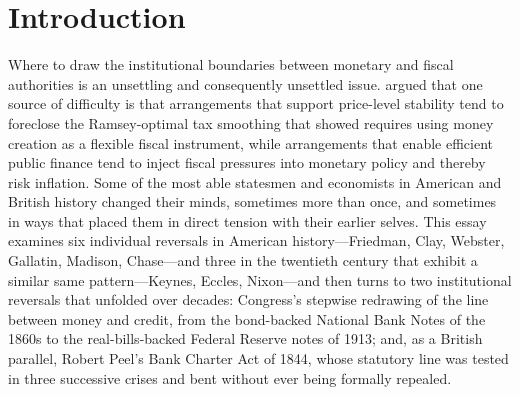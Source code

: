 \documentclass[12pt]{article}
\begin{document}
\begin{abstract}
wage-price controls, and declared himself ``a Keynesian in economics.''
The essay also turns from individual reversals to institutional ones:
the half-century redrawing of the line between \emph{money} and
\emph{credit}, from the bond-backed currency of the National Banking
Acts that Chase championed to the real-bills provisions of the Federal
Reserve Act of 1913; and, as a British parallel, the story of Robert
Peel's Bank Charter Act of 1844 and its three suspensions---a statutory
line bent, not repealed, by the logic of acute financial crisis, and the
occasion for Bagehot's inversion of Currency School orthodoxy.  These
reversals are not signs of weakness or inconsistency; they are evidence
of how contextually sensitive, and how consequential, the institutional
lines really are.  They also reveal a structural pattern: reversals
cluster at moments of systemic stress---wars, panics, and
depressions---when the costs of the existing institutional arrangement
suddenly become undeniable to multiple actors at once.
\end{abstract}
%
%
\section{Introduction}

Where to draw the institutional boundaries between monetary and fiscal
authorities  is an unsettling and consequently unsettled issue.
\citet{Sargent2011} argued that one source of difficulty is that 
arrangements that support price-level stability tend to foreclose the
Ramsey-optimal tax smoothing that \citet{LucasStokey1983} showed
requires using money creation as a flexible fiscal instrument, while
arrangements that enable efficient public finance tend to inject fiscal
pressures into monetary policy and thereby risk inflation.  
%
 Some of the most able statesmen
and economists in American and British history changed their minds,
sometimes more than once, and sometimes in ways that placed them in
direct tension with their earlier selves.  This essay examines six
individual reversals in American history---Friedman, Clay, Webster,
Gallatin, Madison, Chase---and three in the twentieth century that
exhibit a similar same pattern---Keynes, Eccles, Nixon---and then turns to two
institutional reversals that unfolded over decades: Congress's stepwise
redrawing of the line between money and credit, from the bond-backed
National Bank Notes of the 1860s to the real-bills-backed Federal
Reserve notes of 1913; and, as a British parallel, Robert Peel's Bank
Charter Act of 1844, whose statutory line was tested in three successive
crises and bent without ever being formally repealed.
\end{document}
